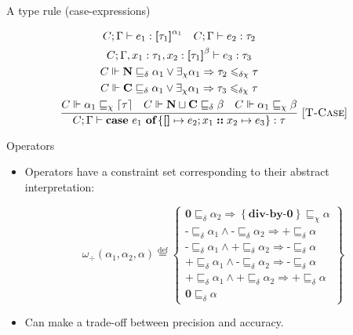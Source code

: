 \documentclass[serif,professionalfont]{beamer}
\renewcommand{\leq}{\leqslant}
\newcommand{\isdef}{\stackrel{\text{def}}{=}}
\newcommand{\LNil}{\bm{\left[\right]}}
\newcommand{\Case}[5]{\textbf{case}\ #1\ \textbf{of} \left\{ \LNil \mapsto #2; #3 \bm{::} #4 \mapsto #5 \right\}}
\newcommand{\Rule}[3]{\frac{#2}{#3}\mbox{\ [\textsc{#1}]}}
\newcommand{\Judge}[3][C; \Gamma]{{#1 \vdash #2 : #3}}              %
\newcommand{\Ref}{\delta}
\newcommand{\Exn}{\chi}
\newcommand{\TopLevel}[1]{\lceil #1\rceil}
\newcommand{\TyList}[2]{\bm{\left[}#1\bm{\right]}^{#2}}
\newcommand{\SingletonNeg}{\textbf{-}}
\newcommand{\SingletonZero}{\textbf{0}}
\newcommand{\SingletonPos}{\textbf{+}}
\newcommand{\SingletonNil}{\textbf{N}}
\newcommand{\SingletonCons}{\textbf{C}}
\newcommand{\CCD}[6][]{#2 \sqsubseteq_\Ref #3 \lor #4 \Rightarrow #5 \leq_{#1} #6}
\theoremstyle{plain}
\theoremstyle{definition}
\begin{document}
\begin{frame}{A type rule (case-expressions)}

    \begin{gather*}
        \Rule{T-Case}
             {\begin{gathered}
              \Judge{e_1}{\TyList{\tau_1}{\alpha_1}}
              \quad \Judge{e_2}{\tau_2}
              \\ \Judge[C; \Gamma, x_1 : \tau_1, x_2 : \TyList{\tau_1}{\beta}]{e_3}{\tau_3}\\
              C \Vdash\CCD[\Ref\Exn]{\SingletonNil}{\alpha_1}{\exists_\Exn \alpha_1}{\tau_2}{\tau}
              \\ C \Vdash\CCD[\Ref\Exn]{\SingletonCons}{\alpha_1}{\exists_\Exn \alpha_1}{\tau_3}{\tau}
              \\ C \Vdash\alpha_1 \sqsubseteq_\Exn \TopLevel{\tau}
              \quad C \Vdash\SingletonNil \sqcup \SingletonCons \sqsubseteq_\Ref \beta
              \quad C \Vdash \alpha_1 \sqsubseteq_\Exn \beta
              \end{gathered}}
             {\Judge{\Case{e_1}{e_2}{x_1}{x_2}{e_3}}{\tau}}
    \end{gather*}

\end{frame}

\begin{frame}{Operators}

    \begin{itemize}
    
        \item Operators have a constraint set corresponding to their abstract interpretation:

            \[ \omega_\div(\alpha_1,\alpha_2,\alpha) \isdef \left\{\begin{gathered}\SingletonZero \sqsubseteq_\Ref \alpha_2 \Rightarrow \left\{\textbf{div-by-0}\right\} \sqsubseteq_\Exn \alpha \\
            \SingletonNeg \sqsubseteq_\Ref \alpha_1 \land \SingletonNeg \sqsubseteq_\Ref \alpha_2 \Rightarrow \SingletonPos \sqsubseteq_\Ref \alpha \\
            \SingletonNeg \sqsubseteq_\Ref \alpha_1 \land \SingletonPos \sqsubseteq_\Ref \alpha_2 \Rightarrow \SingletonNeg \sqsubseteq_\Ref \alpha \\
            \SingletonPos \sqsubseteq_\Ref \alpha_1 \land \SingletonNeg \sqsubseteq_\Ref \alpha_2 \Rightarrow \SingletonNeg \sqsubseteq_\Ref \alpha \\
            \SingletonPos \sqsubseteq_\Ref \alpha_1 \land \SingletonPos \sqsubseteq_\Ref \alpha_2 \Rightarrow \SingletonPos \sqsubseteq_\Ref \alpha \\
            \SingletonZero \sqsubseteq_\Ref \alpha \end{gathered}\right\} \]

        \item Can make a trade-off between precision and accuracy.

    \end{itemize}

\end{frame}
\end{document}
